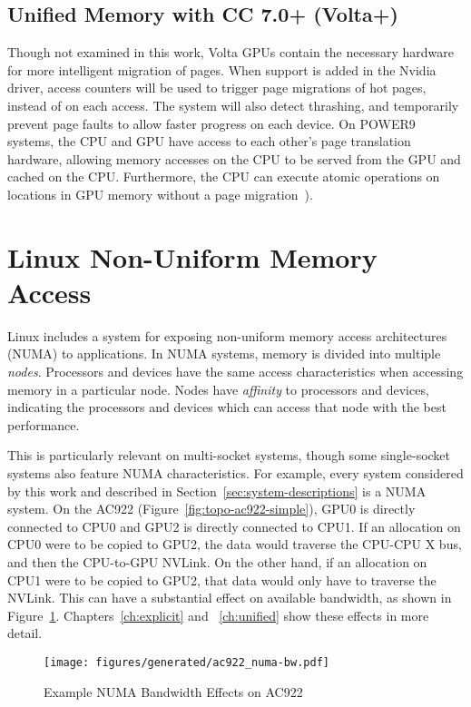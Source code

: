 \subsection {Unified Memory with CC 7.0+ (Volta+) }
Though not examined in this work, Volta GPUs contain the necessary hardware for more intelligent migration of pages.
When support is added in the Nvidia driver, access counters will be used to trigger page migrations of hot pages, instead of on each access.
The system will also detect thrashing, and temporarily prevent page faults to allow faster progress on each device.
On POWER9 systems, the CPU and GPU have access to each other's page translation hardware, allowing memory accesses on the CPU to be served from the GPU and cached on the CPU.
Furthermore, the CPU can execute atomic operations on locations in GPU memory without a page migration~\cite{sakharnykh2017unified}).

\section{Linux Non-Uniform Memory Access}
\label{sec:numa}

Linux includes a system for exposing non-uniform memory access architectures (NUMA) to applications.
In NUMA systems, memory is divided into multiple \textit{nodes}\cite{numa2012}.
Processors and devices have the same access characteristics when accessing memory in a particular node.
Nodes have \textit{affinity} to processors and devices, indicating the processors and devices which can access that node with the best performance.

This is particularly relevant on multi-socket systems, though some single-socket systems also feature NUMA characteristics.
For example, every system considered by this work and described in Section~\ref{sec:system-descriptions} is a NUMA system.
On the AC922 (Figure~\ref{fig:topo-ac922-simple}), GPU0 is directly connected to CPU0 and GPU2 is directly connected to CPU1.
If an allocation on CPU0 were to be copied to GPU2, the data would traverse the CPU-CPU X bus, and then the CPU-to-GPU NVLink.
On the other hand, if an allocation on CPU1 were to be copied to GPU2, that data would only have to traverse the NVLink.
This can have a substantial effect on available bandwidth, as shown in Figure~\ref{fig:numa-bw-example}.
Chapters~\ref{ch:explicit} and ~\ref{ch:unified} show these effects in more detail.

\begin{figure}[H]
    \centering
	\texttt{[image: figures/generated/ac922\_numa-bw.pdf]}
    \caption[Example of NUMA Bandwidth Effects on AC922]{Example NUMA Bandwidth Effects on AC922}
    \label{fig:numa-bw-example}
\end{figure}

